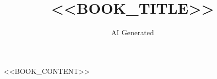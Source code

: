 \documentclass{book}
\begin{document}
\title{<<BOOK_TITLE>>}
\author{AI Generated}
\date{} %

\maketitle

\frontmatter
\tableofcontents

\mainmatter

<<BOOK_CONTENT>>
\end{document}
